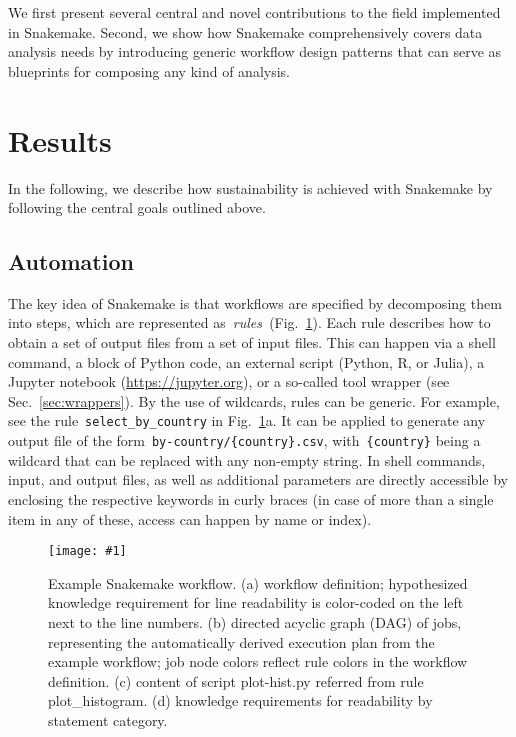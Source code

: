 \documentclass[parskip=half]{scrartcl}
\newcommand{\image}[1]{\centering\texttt{[image: \#1]}}
\let\plainurl\url
\renewcommand{\url}[1]{\protect\plainurl{#1}}
\begin{document}
We first present several central and novel contributions to the field implemented in Snakemake.
Second, we show how Snakemake comprehensively covers data analysis needs by introducing generic workflow design patterns that can serve as blueprints for composing any kind of analysis.

\section{Results}

In the following, we describe how sustainability is achieved with Snakemake by following the central goals outlined above.

\subsection{Automation}

The key idea of Snakemake is that workflows are specified by decomposing them into steps, which are represented as~\emph{rules~}(Fig.~\ref{fig:example}).
Each rule describes how to obtain a set of output files from a set of input files.
This can happen via a shell command, a block of Python code, an external script (Python, R, or Julia), a Jupyter notebook (\url{https://jupyter.org}), or a so-called tool wrapper (see Sec.~\ref{sec:wrappers}).
By the use of wildcards, rules can be generic.
For example, see the rule~\lstinline!select_by_country! in Fig.~\ref{fig:example}a.
It can be applied to generate any output file of the form~\lstinline!by-country/{country}.csv!, with~\lstinline!{country}! being a wildcard that can be replaced with any non-empty string.
In shell commands, input, and output files, as well as additional parameters are directly accessible by enclosing the respective keywords in curly braces (in case of more than a single item in any of these, access can happen by name or index).

\begin{figure}
	\image{example-workflow.pdf}
	\caption{
		Example Snakemake workflow. (a) workflow definition; hypothesized knowledge requirement for line readability is color-coded on the left next to the line numbers. (b) directed acyclic graph (DAG) of jobs, representing the automatically derived execution plan from the example workflow; job node colors reflect rule colors in the workflow definition. (c) content of script plot-hist.py referred from rule plot\_histogram. (d) knowledge requirements for readability by statement category.
	}
	\label{fig:example}
\end{figure}
\end{document}
